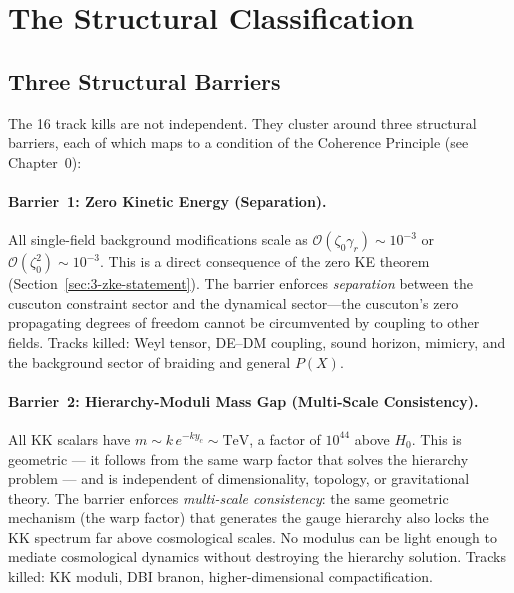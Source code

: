 \section{The Structural Classification}
\label{sec:3-classification}

\subsection{Three Structural Barriers}
\label{sec:3-barriers}

The 16 track kills are not independent. They cluster around three structural barriers, each of which maps to a condition of the Coherence Principle (see Chapter~0):

\paragraph{Barrier~1: Zero Kinetic Energy (Separation).} All single-field background modifications scale as $\mathcal{O}(\zeta_0 \gamma_r) \sim 10^{-3}$ or $\mathcal{O}(\zeta_0^2) \sim 10^{-3}$. This is a direct consequence of the zero KE theorem (Section~\ref{sec:3-zke-statement}). The barrier enforces \emph{separation} between the cuscuton constraint sector and the dynamical sector---the cuscuton's zero propagating degrees of freedom cannot be circumvented by coupling to other fields. Tracks killed: Weyl tensor, DE--DM coupling, sound horizon, mimicry, and the background sector of braiding and general $P(X)$.

\paragraph{Barrier~2: Hierarchy-Moduli Mass Gap (Multi-Scale Consistency).} All KK scalars have $m \sim k\,e^{-ky_c} \sim \mathrm{TeV}$, a factor of $10^{44}$ above $H_0$. This is geometric --- it follows from the same warp factor that solves the hierarchy problem --- and is independent of dimensionality, topology, or gravitational theory. The barrier enforces \emph{multi-scale consistency}: the same geometric mechanism (the warp factor) that generates the gauge hierarchy also locks the KK spectrum far above cosmological scales. No modulus can be light enough to mediate cosmological dynamics without destroying the hierarchy solution. Tracks killed: KK moduli, DBI branon, higher-dimensional compactification.

